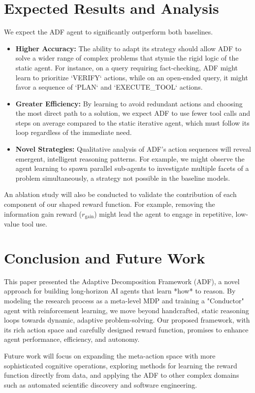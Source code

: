 \documentclass{article}
\begin{document}
\section{Expected Results and Analysis}
We expect the ADF agent to significantly outperform both baselines.
\begin{itemize}
    \item \textbf{Higher Accuracy:} The ability to adapt its strategy should allow ADF to solve a wider range of complex problems that stymie the rigid logic of the static agent. For instance, on a query requiring fact-checking, ADF might learn to prioritize `VERIFY` actions, while on an open-ended query, it might favor a sequence of `PLAN` and `EXECUTE_TOOL` actions.
    \item \textbf{Greater Efficiency:} By learning to avoid redundant actions and choosing the most direct path to a solution, we expect ADF to use fewer tool calls and steps on average compared to the static iterative agent, which must follow its loop regardless of the immediate need.
    \item \textbf{Novel Strategies:} Qualitative analysis of ADF's action sequences will reveal emergent, intelligent reasoning patterns. For example, we might observe the agent learning to spawn parallel sub-agents to investigate multiple facets of a problem simultaneously, a strategy not possible in the baseline models.
\end{itemize}
An ablation study will also be conducted to validate the contribution of each component of our shaped reward function. For example, removing the information gain reward ($r_{\text{gain}}$) might lead the agent to engage in repetitive, low-value tool use.

\section{Conclusion and Future Work}
This paper presented the Adaptive Decomposition Framework (ADF), a novel approach for building long-horizon AI agents that learn *how* to reason. By modeling the research process as a meta-level MDP and training a "Conductor" agent with reinforcement learning, we move beyond handcrafted, static reasoning loops towards dynamic, adaptive problem-solving. Our proposed framework, with its rich action space and carefully designed reward function, promises to enhance agent performance, efficiency, and autonomy.

Future work will focus on expanding the meta-action space with more sophisticated cognitive operations, exploring methods for learning the reward function directly from data, and applying the ADF to other complex domains such as automated scientific discovery and software engineering.
\end{document}
